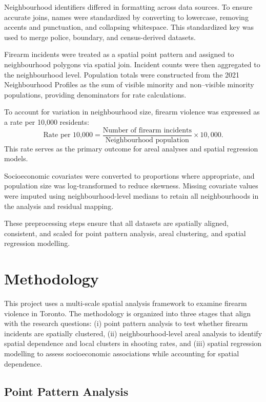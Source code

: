 \documentclass{article}
\begin{document}
\noindent Neighbourhood identifiers differed in formatting across data sources. To ensure accurate joins, names were standardized by converting to lowercase, removing accents and punctuation, and collapsing whitespace. This standardized key was used to merge police, boundary, and census-derived datasets.

\noindent Firearm incidents were treated as a spatial point pattern and assigned to neighbourhood polygons via spatial join. Incident counts were then aggregated to the neighbourhood level. Population totals were constructed from the 2021 Neighbourhood Profiles as the sum of visible minority and non–visible minority populations, providing denominators for rate calculations.

\noindent To account for variation in neighbourhood size, firearm violence was expressed as a rate per 10{,}000 residents:
\[
\text{Rate per 10,000} = \frac{\text{Number of firearm incidents}}{\text{Neighbourhood population}} \times 10,000.
\]
This rate serves as the primary outcome for areal analyses and spatial regression models.

\noindent Socioeconomic covariates were converted to proportions where appropriate, and population size was log-transformed to reduce skewness. Missing covariate values were imputed using neighbourhood-level medians to retain all neighbourhoods in the analysis and residual mapping.

\noindent These preprocessing steps ensure that all datasets are spatially aligned, consistent, and scaled for point pattern analysis, areal clustering, and spatial regression modelling.


\section{Methodology}

\noindent This project uses a multi-scale spatial analysis framework to examine firearm violence in Toronto. The methodology is organized into three stages that align with the research questions: (i) point pattern analysis to test whether firearm incidents are spatially clustered, (ii) neighbourhood-level areal analysis to identify spatial dependence and local clusters in shooting rates, and (iii) spatial regression modelling to assess socioeconomic associations while accounting for spatial dependence.

\subsection{Point Pattern Analysis}
\end{document}
